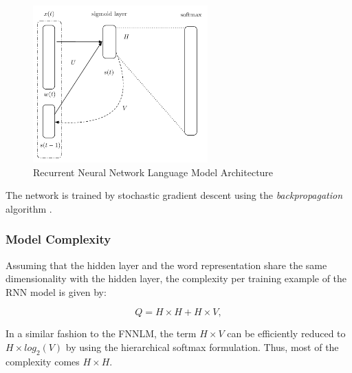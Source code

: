 \begin{figure}[hptb!]
    \centering
    \includegraphics[width=0.6\textwidth]{images/mikolov-rnnlm.pdf} 
    \caption{Recurrent Neural Network Language Model Architecture}
    \label{fig:RNNLM_architecture}
\end{figure}

The network is trained by  stochastic gradient descent using the
\textit{backpropagation} algorithm \cite{Bishop:1995:NNP:525960}.


\subsubsection{Model Complexity}
\label{sec:sub:sub:mikolov_rnnlm_complexity}

Assuming that the hidden layer and the word representation share the same
dimensionality with the hidden layer, the complexity per training example of the RNN model is
given by:


\begin{equation} Q = H \times H + H \times V,   \end{equation}

In a similar fashion to the \ac{FNNLM}, the term $H \times V$ can be
efficiently reduced to $H \times log_2(V)$ by using the hierarchical softmax
formulation. Thus, most of the complexity comes $H \times H$.





